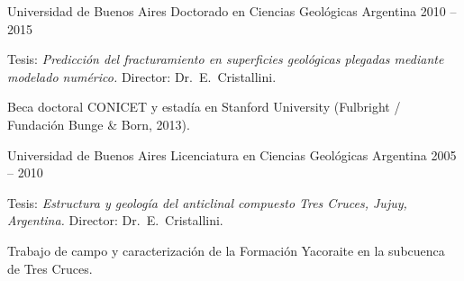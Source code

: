 
\begin{cventries}

\cventry
    {Universidad de Buenos Aires}
    {Doctorado en Ciencias Geológicas}
    {Argentina}
    {2010 -- 2015}
    {
      \begin{cvitems}
        \item {Tesis: \textit{Predicción del fracturamiento en superficies geológicas plegadas mediante modelado numérico.} Director: Dr.\ E.\ Cristallini.}
        \item {Beca doctoral CONICET y estadía en Stanford University (Fulbright / Fundación Bunge \& Born, 2013).}
      \end{cvitems}
    }

\cventry
    {Universidad de Buenos Aires}
    {Licenciatura en Ciencias Geológicas}
    {Argentina}
    {2005 -- 2010}
    {
      \begin{cvitems}
        \item {Tesis: \textit{Estructura y geología del anticlinal compuesto Tres Cruces, Jujuy, Argentina.} Director: Dr.\ E.\ Cristallini.}
        \item {Trabajo de campo y caracterización de la Formación Yacoraite en la subcuenca de Tres Cruces.}
      \end{cvitems}
    }

\end{cventries}
